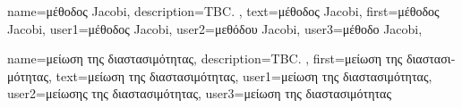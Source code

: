 {name={\foreignlanguage{greek}{μέθοδος} Jacobi},
	description={TBC. },
	text={\foreignlanguage{greek}{μέθοδος} Jacobi}, 
	first={\foreignlanguage{greek}{μέθοδος} Jacobi},
	user1={\foreignlanguage{greek}{μέθοδος} Jacobi}, %
	user2={\foreignlanguage{greek}{μεθόδου} Jacobi}, %
	user3={\foreignlanguage{greek}{μέθοδο} Jacobi}, %
}

{name={\foreignlanguage{greek}{μείωση της διαστασιμότητας}},
	description={TBC. }, 
	first={\foreignlanguage{greek}{μεί\-ω\-ση της διαστασιμότητας}},
	text={\foreignlanguage{greek}{μεί\-ω\-ση της διαστασιμότητας}},
	user1={\foreignlanguage{greek}{μείωση της διαστασιμότητας}}, %
	user2={\foreignlanguage{greek}{μείωσης της διαστασιμότητας}}, %
	user3={\foreignlanguage{greek}{μείωση της διαστασιμότητας}} %
}

